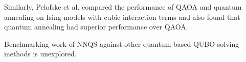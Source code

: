 Similarly, Pelofske et al. \cite{b35} compared the performance of QAOA and quantum annealing on Ising models with cubic interaction terms and also found that quantum annealing had superior performance over QAOA. 

Benchmarking work of NNQS against other quantum-based QUBO solving methods is unexplored.
